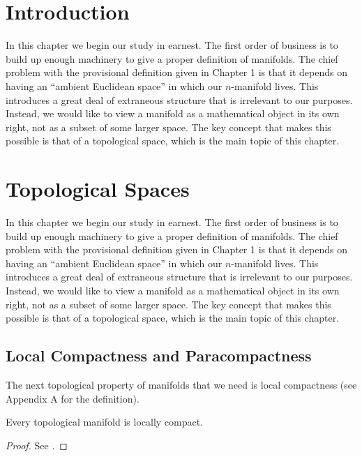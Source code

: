 \documentclass[12pt, ThmSectionNumbering]{CrispyNotes}
\begin{document}
\hypertarget{bm:Introduction}{\section*{Introduction}}

In this chapter we begin our study in earnest. The first order of business is to build up enough machinery to give a proper definition of manifolds. The chief problem with the provisional definition given in Chapter 1 is that it depends on having an \enquote{ambient Euclidean space} in which our $n$-manifold lives. This introduces a great deal of extraneous structure that is irrelevant to our purposes. Instead, we would like to view a manifold as a mathematical object in its own right, not as a subset of some larger space. The key concept that makes this possible is that of a topological space, which is the main topic of this chapter. \nocite{*}

\section{Topological Spaces}


In this chapter we begin our study in earnest. The first order of business is to build up enough machinery to give a proper definition of manifolds. The chief problem with the provisional definition given in Chapter 1 is that it depends on having an \enquote{ambient Euclidean space} in which our $n$-manifold lives. This introduces a great deal of extraneous structure that is irrelevant to our purposes. Instead, we would like to view a manifold as a mathematical object in its own right, not as a subset of some larger space. The key concept that makes this possible is that of a topological space, which is the main topic of this chapter.

\subsection{Local Compactness and Paracompactness}

The next topological property of manifolds that we need is local compactness (see Appendix A for the definition).
\begin{proposition}\label{prop1}
    Every topological manifold is locally compact.
\end{proposition}
\begin{proof}
    See \cite[47]{leeIntroductionSmoothManifolds2013}.
\end{proof}
\end{document}
